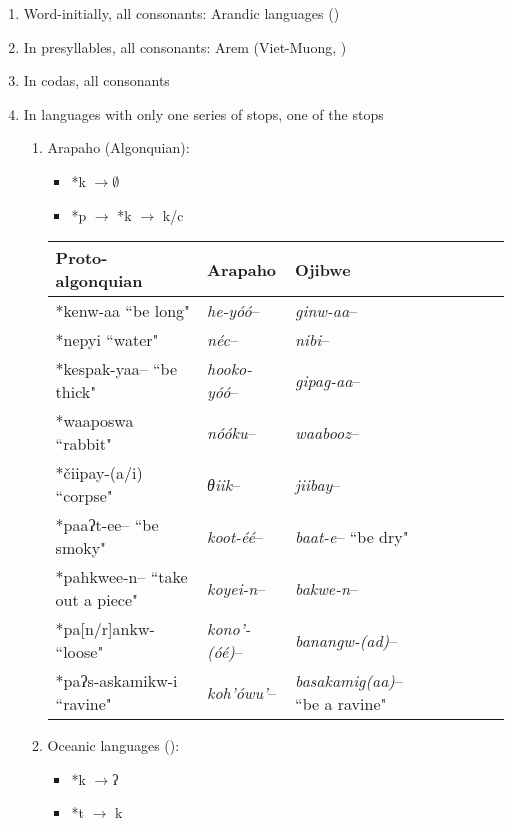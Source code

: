\documentclass[oldfontcommands,oneside,a4paper,11pt]{article}
\newcommand{\ipa}[1]{{\phon \mbox{#1}}} %
\begin{document}
 
  \begin{enumerate}
  \item  Word-initially, all consonants: Arandic languages (\citealt{koch04arandic})
\item In presyllables, all consonants:  Arem (Viet-Muong, \citealt{ferlus96monosyllabisme})
\item In codas, all consonants

\item In languages with only one series of stops, one of the stops
  \begin{enumerate}
\item   Arapaho (Algonquian):

 \begin{itemize}
\item \ipa{*k} $\rightarrow \emptyset$
\item \ipa{*p} $\rightarrow$ \ipa{*k} $\rightarrow$  \ipa{k/c}
\end{itemize}

 \begin{table}[H]
 \centering  \label{tab:k.zero}
\begin{tabular}{lllllll}
\toprule
Proto-algonquian & Arapaho & Ojibwe \\
\midrule
  \ipa{*kenw-aa} ``be long" & \textit{he-yóó}--    &  \textit{ginw-aa}-- \\
  \ipa{*nepyi} ``water" & \textit{néc}--    &  \textit{nibi}-- \\
 \ipa{*kespak-yaa--} ``be thick" & \textit{hooko-yóó}--    &  \textit{gipag-aa}-- \\
 \ipa{*waaposwa} ``rabbit" & \textit{nóóku}--    &  \textit{waabooz}-- \\
  \ipa{*čiipay-(a/i)} ``corpse" & \textit{θiik}--    &  \textit{jiibay}-- \\
  \ipa{*paaʔt-ee--} ``be smoky" & \textit{koot-éé}--    &  \textit{baat-e}-- ``be dry"\\
    \ipa{*pahkwee-n--} ``take out a piece" & \textit{koyei-n}--    &  \textit{bakwe-n}-- \\
        \ipa{*pa[n/r]ankw-} ``loose" & \textit{kono'-(óé)}--    &  \textit{banangw-(ad)}-- \\ 
   \ipa{*paʔs-askamikw-i} ``ravine" & \textit{koh'ówu'}--    &  \textit{basakamig(aa)}-- ``be a ravine"\\ 
\bottomrule
\end{tabular}
\end{table}

\item Oceanic languages (\citealt{blust04tk}):
 
 \begin{itemize}
\item \ipa{*k} $\rightarrow $\ipa{ʔ}
\item \ipa{*t} $\rightarrow$ \ipa{k}  
\end{itemize} 
 \end{enumerate}
 \end{enumerate}
 
\end{document}
